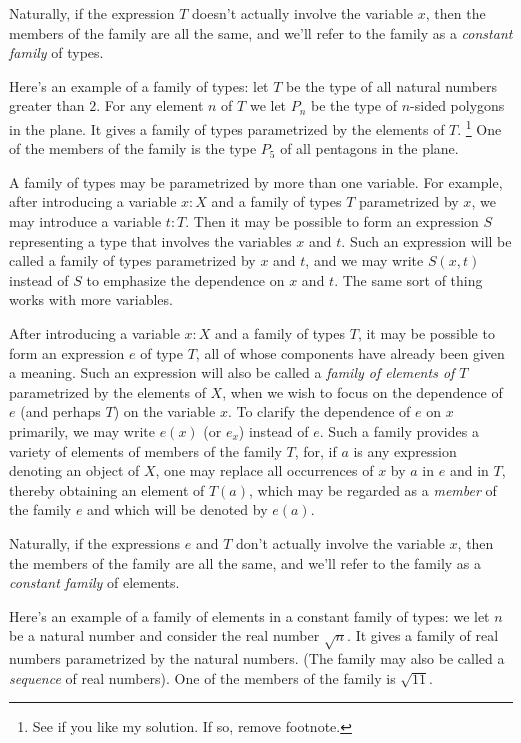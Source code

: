 Naturally, if the expression $T$ doesn't actually involve the variable $x$, then the members of the family are all the same,
and we'll refer to the family as a \emph{constant family} of types.

Here's an example of a family of types: let $T$ be the type
of all natural numbers greater than $2$. For any element $n$ of $T$
we let $P_n$ be the type of $n$-sided polygons in the plane.
It gives a family of types parametrized by the elements of $T$.%
\footnote{\color{casred} See if you like my solution. If so, remove footnote.}
One of the members of the family is the type $P_5$ of all pentagons in the plane.

A family of types may be parametrized by more than one variable.  For example, after introducing a variable $x:X$ and a family of types $T$
parametrized by $x$, we may introduce a variable $t:T$.  Then it may be possible to form an expression $S$ representing a type that involves the
variables $x$ and $t$.  Such an expression will be called a family of types parametrized by $x$ and $t$, and we may write $S(x,t)$ instead of
$S$ to emphasize the dependence on $x$ and $t$.  The same sort of thing works with more variables.

After introducing a variable $x:X$ and a family of types $T$, it may be possible to form an expression $e$ of type $T$, all of whose components have already been
given a meaning.
Such an expression will also be called a \emph{family of elements of $T$}  parametrized by the elements of $X$, when
we wish to focus on the dependence of $e$ (and perhaps $T$) on the variable $x$.
To clarify the dependence of $e$ on $x$ primarily, we may write $e(x)$ (or $e_x$) instead of $e$.
Such a family provides a variety of elements of members of the family $T$, for, if $a$ is any expression denoting an object of $X$, one may replace all
occurrences of $x$ by $a$ in $e$ and in $T$, thereby obtaining an element of $T(a)$, which may be regarded as a \emph{member} of the family $e$
and which will be denoted by $e(a)$.

Naturally, if the expressions $e$ and $T$ don't actually involve the variable $x$, then the members of the family are all the same,
and we'll refer to the family as a \emph{constant family} of elements.

Here's an example of a family of elements in a constant family of types: we let $n$ be a natural number and consider the real number $\sqrt n$.
It gives a family of real numbers parametrized by the natural numbers.
(The family may also be called a \emph{sequence} of real numbers).
One of the members of the family is $\sqrt{11}$.

